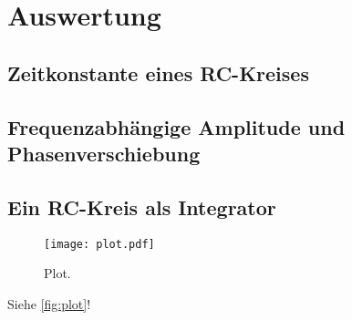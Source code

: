 \section{Auswertung}
\label{sec:Auswertung}

\subsection{Zeitkonstante eines RC-Kreises} %
\label{sub:Zeitkonstante}


\subsection{Frequenzabhängige Amplitude und Phasenverschiebung} %
\label{sub:Freque-A&P}


\subsection{Ein RC-Kreis als Integrator} %
\label{sub:Integrator}

\begin{figure}
  \centering
  \texttt{[image: plot.pdf]}
  \caption{Plot.}
  \label{fig:plot}
\end{figure}


Siehe \autoref{fig:plot}!
